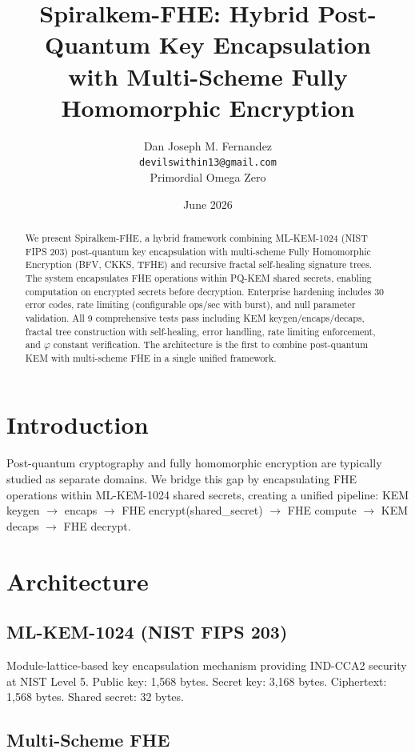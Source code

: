 \documentclass{article}
\title{Spiralkem-FHE: Hybrid Post-Quantum Key Encapsulation\\
with Multi-Scheme Fully Homomorphic Encryption}
\author{Dan Joseph M. Fernandez\\
\texttt{devilswithin13@gmail.com}\\
Primordial Omega Zero}
\date{June 2026}
\begin{document}
\maketitle

\begin{abstract}
We present Spiralkem-FHE, a hybrid framework combining ML-KEM-1024 (NIST FIPS 203) post-quantum key encapsulation with multi-scheme Fully Homomorphic Encryption (BFV, CKKS, TFHE) and recursive fractal self-healing signature trees. The system encapsulates FHE operations within PQ-KEM shared secrets, enabling computation on encrypted secrets before decryption. Enterprise hardening includes 30 error codes, rate limiting (configurable ops/sec with burst), and null parameter validation. All 9 comprehensive tests pass including KEM keygen/encaps/decaps, fractal tree construction with self-healing, error handling, rate limiting enforcement, and $\varphi$ constant verification. The architecture is the first to combine post-quantum KEM with multi-scheme FHE in a single unified framework.
\end{abstract}

\section{Introduction}

Post-quantum cryptography and fully homomorphic encryption are typically studied as separate domains. We bridge this gap by encapsulating FHE operations within ML-KEM-1024 shared secrets, creating a unified pipeline: KEM keygen $\rightarrow$ encaps $\rightarrow$ FHE encrypt(shared\_secret) $\rightarrow$ FHE compute $\rightarrow$ KEM decaps $\rightarrow$ FHE decrypt.

\section{Architecture}

\subsection{ML-KEM-1024 (NIST FIPS 203)}

Module-lattice-based key encapsulation mechanism providing IND-CCA2 security at NIST Level 5. Public key: 1,568 bytes. Secret key: 3,168 bytes. Ciphertext: 1,568 bytes. Shared secret: 32 bytes.

\subsection{Multi-Scheme FHE}
\end{document}
